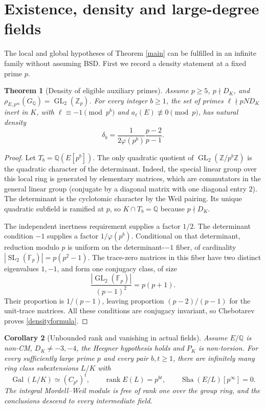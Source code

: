 \documentclass[11pt,a4paper]{article}
\newtheorem{theorem}{Theorem}[section]\newtheorem{proposition}[theorem]{Proposition}\newtheorem{lemma}[theorem]{Lemma}\newtheorem{corollary}[theorem]{Corollary}\theoremstyle{definition}\newtheorem{definition}[theorem]{Definition}\theoremstyle{remark}\newtheorem{remark}[theorem]{Remark}
\newcommand{\Zp}{\mathbb Z_p}\newcommand{\Qp}{\mathbb Q_p}\newcommand{\Fp}{\mathbb F_p}\newcommand{\Q}{\mathbb Q}\newcommand{\Sha}{\operatorname{Sha}}\newcommand{\Sel}{\operatorname{Sel}}\newcommand{\Gal}{\operatorname{Gal}}\newcommand{\Tr}{\operatorname{Tr}}\newcommand{\rk}{\operatorname{rank}}\newcommand{\ord}{\operatorname{ord}}\newcommand{\Hom}{\operatorname{Hom}}\newcommand{\SL}{\operatorname{SL}}\newcommand{\GL}{\operatorname{GL}}\newcommand{\coker}{\operatorname{coker}}\newcommand{\length}{\operatorname{length}}\newcommand{\res}{\operatorname{res}}\newcommand{\cor}{\operatorname{cor}}\newcommand{\Id}{\operatorname{id}}
\numberwithin{equation}{section}
\begin{document}
\section{Existence, density and large-degree fields}\label{exist}
The local and global hypotheses of Theorem \ref{main} can be fulfilled in an infinite family without assuming BSD. First we record a density statement at a fixed prime $p$.
\begin{theorem}[Density of eligible auxiliary primes]\label{density}
Assume $p\ge5$, $p\nmid D_K$, and $\rho_{E,p^\infty}(G_\Q)=\GL_2(\Zp)$. For every integer $b\ge1$, the set of primes $\ell\nmid pND_K$ inert in $K$, with $\ell\equiv-1\pmod{p^b}$ and $a_\ell(E)\not\equiv0\pmod p$, has natural density
\begin{equation}\label{densityformula}
\delta_b=\frac{1}{2\varphi(p^b)}\frac{p-2}{p-1}.
\end{equation}
\end{theorem}
\begin{proof}
Let $T_b=\Q(E[p^b])$. The only quadratic quotient of $\GL_2(\mathbb Z/p^b\mathbb Z)$ is the quadratic character of the determinant. Indeed, the special linear group over this local ring is generated by elementary matrices, which are commutators in the general linear group (conjugate by a diagonal matrix with one diagonal entry $2$). The determinant is the cyclotomic character by the Weil pairing. Its unique quadratic subfield is ramified at $p$, so $K\cap T_b=\Q$ because $p\nmid D_K$.

The independent inertness requirement supplies a factor $1/2$. The determinant condition $-1$ supplies a factor $1/\varphi(p^b)$. Conditional on that determinant, reduction modulo $p$ is uniform on the determinant-$-1$ fiber, of cardinality $|\SL_2(\Fp)|=p(p^2-1)$. The trace-zero matrices in this fiber have two distinct eigenvalues $1,-1$, and form one conjugacy class, of size
\[ \frac{|\GL_2(\Fp)|}{(p-1)^2}=p(p+1). \]
Their proportion is $1/(p-1)$, leaving proportion $(p-2)/(p-1)$ for the unit-trace matrices. All these conditions are conjugacy invariant, so Chebotarev proves \eqref{densityformula}.
\end{proof}
\begin{corollary}[Unbounded rank and vanishing in actual fields]\label{infinite}
Assume $E/\Q$ is non-CM, $D_K\ne-3,-4$, the Heegner hypothesis holds and $P_K$ is non-torsion. For every sufficiently large prime $p$ and every pair $b,t\ge1$, there are infinitely many ring class subextensions $L/K$ with
\begin{equation}\label{product}
\Gal(L/K)\simeq(C_{p^b})^t,\qquad \rk E(L)=p^{bt},\qquad \Sha(E/L)[p^\infty]=0.
\end{equation}
The integral Mordell--Weil module is free of rank one over the group ring, and the conclusions descend to every intermediate field.
\end{corollary}
\end{document}
